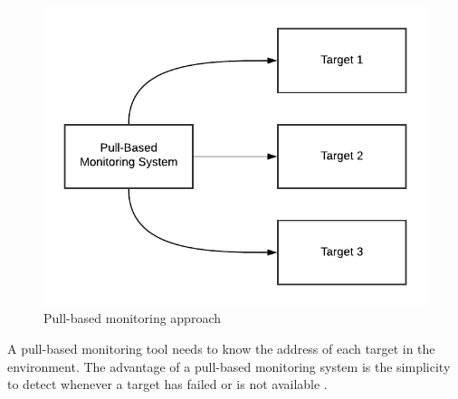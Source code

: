 \begin{figure}[h]
\centering
\includegraphics[scale=0.8]{images/02_theoretical_foundation/monitoring/pull_based}
\caption{Pull-based monitoring approach}
\label{fig:mon_pull-based}
\end{figure}
A pull-based monitoring tool needs to know the address of each target in the environment.
The advantage of a pull-based monitoring system is the simplicity to detect whenever a target has failed or is not available \cite{Farcic2017Toolkit21}.


